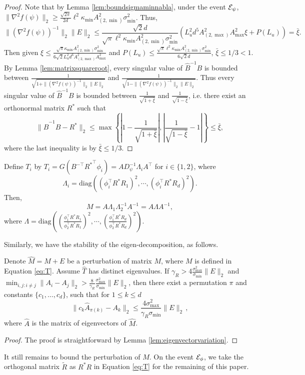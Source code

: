 \begin{proof}
Note that by Lemma \ref{lem:boundsigmaminnabla},  under the event $\mathcal{E}_{\psi}$, $\|\nabla^2f(\psi)\|_2 \ge \frac{\sqrt{2\pi}}{2d}\ell^2\kappa_{\min}A^2_{(2,\min)}\sigma_{\min}^2$. Thus,
\[
\|\left(\nabla^2f(\psi)\right)^{-1}\|_2 \|E\|_2 \le \frac{\sqrt{2}d}{\sqrt{\pi}\ell^2\kappa_{\min}A^2_{(2,\min)}\sigma_{\min}^2}\left(L_u^2d^5 A_{(2,\max)}^2A_{\max}^2\xi + P(L_u)\right) = \bar{\xi}.
\]
Then given $\xi \le \frac{\sqrt{\pi}\kappa_{\min}A^2_{(2,\min)}\sigma_{\min}^2}{6\sqrt{2}L_u^2d^6A_{(2,\max)}^2A_{\max}^2}$
and 
$P(L_u) \le \frac{\sqrt{\pi}\ell^2\kappa_{\min}A^2_{(2,\min)}\sigma_{\min}^2}{6\sqrt{2}d}$, $\bar{\xi} \le 1/3 < 1$. 
By Lemma \ref{lem:matrixsquareroot}, every singular value of $\hat{B}^{-1}B$ is bounded between $\frac{1}{\sqrt{1 + \|\left(\nabla^2f(\psi)\right)^{-1}\|_2 \|E\|_2}}$ and $\frac{1}{\sqrt{1 - \|\left(\nabla^2f(\psi)\right)^{-1}\|_2 \|E\|_2}}$. 
Thus every singular value of $\hat{B}^{-1}B$ is bounded between $\frac{1}{\sqrt{1+\bar{\xi}}}$ and $\frac{1}{\sqrt{1-\bar{\xi}}}$, i.e. there exist an orthonormal matrix $R^*$ such that 
\[
\|\hat{B}^{-1}B - R^*\|_2 \le \max \left\{ \left|1-\frac{1}{\sqrt{1+\bar{\xi}}}\right| , \left|\frac{1}{\sqrt{1-\bar{\xi}}}-1\right| \right\} \le \bar{\xi},
\]
where the last inequality is by $\bar{\xi} \le 1/3$.
\end{proof}

Define $T_i$ by $T_i = G(B^{-\top}{R^*}^{\top}\phi_i) = A D_{\psi}^{-1}\Lambda_iA^{\top}$ for $i \in \{1,2\}$,
where 
\[\Lambda_i = \text{diag}\left((\phi_i^{\top}R^*R_1)^2, \cdots, (\phi_i^{\top}R^*R_d)^2\right).
\] 
Then, 
\begin{equation}
\label{eq:T}
M = A \Lambda_1 \Lambda_2^{-1} A^{-1} = A \Lambda A^{-1},
\end{equation}
where $\Lambda = \text{diag}\left((\frac{\phi_1^{\top}R^*R_1}{\phi_2^{\top}R^*R_1})^2, \cdots, (\frac{\phi_1^{\top}R^*R_d}{\phi_2^{\top}R^*R_d})^2\right)$. 

Similarly, we have the stability of the eigen-decomposition, as follows. 
\begin{lemma}
\label{lem:Teigenvectorvariation}
Denote $\hat{M} = M+E$ be a perturbation of matrix $M$, where $M$ is defined in Equation \eqref{eq:T}. 
Assume $\hat{T}$ has distinct eigenvalues. 
If $\gamma_R > 4 \frac{\sigma_{\max}^2}{\sigma_{\min} }\|E\|_2$ and $\min_{i,j:i\neq j} \|A_i - A_j\|_2 > \frac{8}{\gamma_R}\frac{\sigma_{\max}^2}{\sigma_{\min}} \|E\|_2$, then there exist a permutation $\pi$ and constants $\{c_1,\ldots,c_d\}$, such that for $1\le k\le d$
\[
\| c_k\hat{A}_{\pi(k)} - A_k\|_2 \le \frac{4\sigma^2_{\max}}{\gamma_R\sigma_{\min}} \|E\|_2\,,
\]
where $\hat{A}$ is the matrix of eigenvectors of $\hat{M}$. 
\end{lemma}
\begin{proof}
The proof is straightforward by Lemma \ref{lem:eigenvectorvariation}.
\end{proof}
\fi
It still remains to bound the perturbation of $M$. %
On the event $\mathcal{E}_{\phi}$, we take the orthogonal matrix $\tilde{R}$ as $R^*R$ in Equation \ref{eq:T} for the remaining of this paper.

